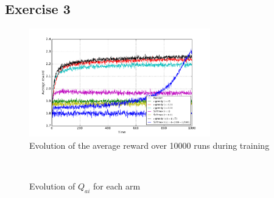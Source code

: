 \documentclass[a4paper]{article}
\begin{document}
\subsection{Exercise 3}
\begin{figure}[H]
	\centering
	\includegraphics[width=0.7\textwidth]{./fig/ex1-3.pdf}
	\caption{Evolution of the average reward over 10000 runs during training}
	\label{ex13perf}
\end{figure}
\begin{figure}[H]
	\centering
	\\
	\caption{Evolution of $Q_{ai}$ for each arm}
	\label{ex13q}
\end{figure}
\end{document}
